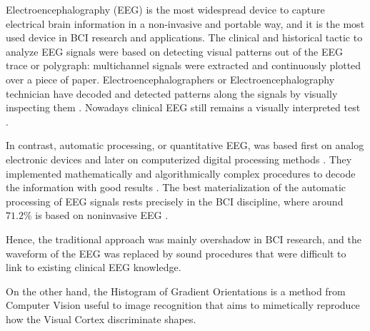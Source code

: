 
Electroencephalography (EEG) is the most widespread device to capture electrical brain information in a non-invasive and portable way, and it is the most used device in BCI research and applications.  The clinical and historical tactic to analyze EEG signals were based on detecting visual patterns out of the EEG trace or polygraph\cite{Hartman2005}: multichannel signals were extracted and continuously plotted over a piece of paper. Electroencephalographers or Electroencephalography technician have decoded and detected patterns along the signals by visually inspecting them \cite{Schomer2010}.   Nowadays clinical EEG still remains a visually interpreted test \cite{Hartman2005}.

In contrast, automatic processing, or quantitative EEG, was based first on analog electronic devices and later on computerized digital processing methods \cite{Jansen1991}.  They implemented mathematically and algorithmically complex procedures to decode the information with good results \cite{Yuste2017}.  The best materialization of the automatic processing of EEG signals rests precisely in the BCI discipline, where around $71.2\%$ is based on noninvasive EEG \cite{Guger2017}.  


Hence, the traditional  approach was mainly overshadow in BCI research, and the waveform of the EEG was replaced by sound procedures that were difficult to link to existing clinical EEG knowledge.  


On the other hand, the Histogram of Gradient Orientations is a method from Computer Vision useful to image recognition that aims to mimetically reproduce how the Visual Cortex discriminate shapes.

